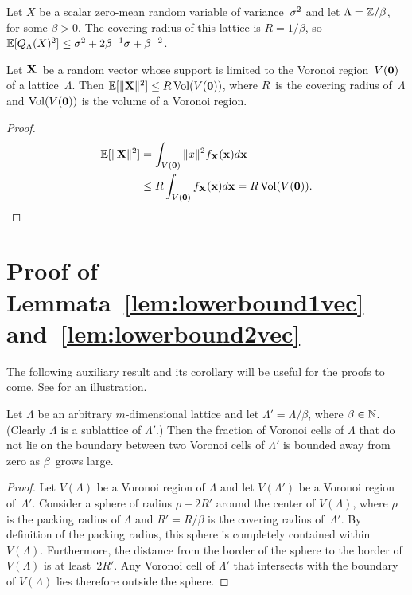 \begin{subappendices}
  \begin{example}
    Let $X$ be a scalar zero-mean random variable of variance~${\sigma^2}$ and let
    $\Lambda = \mathbb{Z} / \beta$, for some $\beta > 0$. The covering radius of this
    lattice is $R = 1/\beta$, so $\mathbb{E}[{Q_{\Lambda}}(X)^2] \le {\sigma^2} + 2 \beta^{-1} \sigma +
    \beta^{-2}$.
  \end{example}

  \begin{lemma}
    \label{lem:voronoivarbound}
    Let $\mathbf{X}$~be a random vector whose support is limited to the Voronoi
    region~$V(\mathbf{0})$ of a lattice~$\Lambda$. Then $\mathbb{E}[\|\mathbf{X}\|^2] \le
    R\operatorname{Vol}(V(\mathbf{0}))$, where $R$~is the covering
    radius of~$\Lambda$ and $\operatorname{Vol}(V(\mathbf{0}))$ is the volume of a Voronoi region.
  \end{lemma}

  \begin{proof}
    \begin{align*}
      \mathbb{E}[\|\mathbf{X}\|^2] & = \int_{V(\mathbf{0})} \|x\|^2 f_{\mathbf{X}}(\mathbf{x}) d\mathbf{x} \\
      & \le R \int_{V(\mathbf{0})} f_{\mathbf{X}}(\mathbf{x}) d\mathbf{x} = R \operatorname{Vol}(V(\mathbf{0})).
    \end{align*}
  \end{proof}




  \section{Proof of Lemmata~\ref{lem:lowerbound1vec}
  and~\ref{lem:lowerbound2vec}}\label{app:lbvecproofs}

  The following auxiliary result and its corollary will be useful for the proofs
  to come. See  for an illustration.

  \begin{lemma}
    \label{lem:subvoronoi}
    Let $\Lambda$ be an arbitrary $m$-dimensional lattice and let $\Lambda' =
    \Lambda/\beta$, where $\beta \in {\mathbb{N}}$. (Clearly $\Lambda$ is a sublattice of
    $\Lambda'$.) Then the fraction of Voronoi cells of $\Lambda$ that do not lie
    on the boundary between two Voronoi cells of $\Lambda'$ is bounded away from
    zero as $\beta$~grows large.
  \end{lemma}

  \begin{proof}
    Let $V(\Lambda)$ be a Voronoi region of $\Lambda$ and let $V(\Lambda')$ be a
    Voronoi region of~$\Lambda'$.  Consider a sphere of radius $\rho - 2R'$
    around the center of $V(\Lambda)$, where $\rho$ is the
    packing radius of $\Lambda$ and $R' = R/\beta$ is
    the covering radius of~$\Lambda'$. By definition of the packing radius, this
    sphere is completely contained within $V(\Lambda)$. Furthermore, the
    distance from the border of the sphere to the border of $V(\Lambda)$ is
    at least~$2R'$. Any Voronoi cell of $\Lambda'$ that intersects
    with the boundary of $V(\Lambda)$ lies therefore outside the sphere. 
    

\end{proof}
\end{subappendices}
